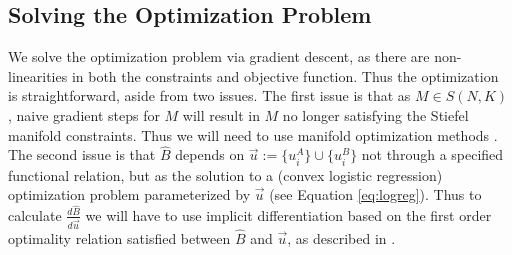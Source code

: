 \documentclass[8pt]{article}
\begin{document}
\subsection{Solving the Optimization Problem}
We solve the optimization problem via gradient descent, as there are non-linearities in both the constraints and objective function.  Thus the optimization is straightforward, aside from two issues.
The first issue is that as $M\in S(N,K)$, naive gradient steps for $M$ will result in $M$ no longer satisfying the Stiefel manifold constraints.  Thus we will need to use manifold optimization methods \cite{edelman1998geometry}.
The second issue is that $\hat{B}$ depends on $\vec{u}:=\{u_i^A\} \cup \{u_i^B\}$ not through a specified functional relation, but as the solution to a (convex logistic regression) optimization problem parameterized by $\vec{u}$ (see Equation \ref{eq:logreg}).  Thus to calculate $\tfrac{d\hat{B}}{d\vec{u}}$ we will have to use implicit differentiation based on the first order optimality relation satisfied between $\hat{B}$ and $\vec{u}$, as described in \cite{bengio2000gradient}.



\end{document}
